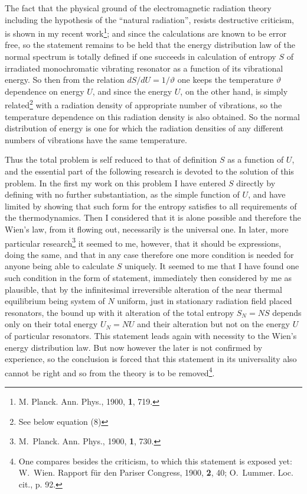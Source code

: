 \documentclass{article}
\begin{document}
The fact that the physical ground of the electromagnetic radiation theory 
including the hypothesis of the ``natural radiation'', 
resists destructive criticism, is shown
in my recent work\footnote{M. Planck. Ann. Phys., 1900, {\bf 1}, 719.};
and since the calculations are known to be error free, 
so the statement remains to be held 
that the energy distribution law of the normal spectrum is totally defined 
if one succeeds in calculation of entropy $S$ of irradiated 
monochromatic vibrating resonator as a function of its vibrational energy. 
So then from the relation $dS/dU = 1/\vartheta$ one keeps the temperature 
$\vartheta$ dependence on energy $U$, 
and since the energy $U$, on the other hand, is simply 
related\footnote{See below equation (8)} 
with a radiation density of appropriate number of vibrations, 
so the temperature dependence on this radiation density is also obtained.
So the normal distribution of energy is one for which the radiation densities 
of any different numbers of vibrations have the same temperature.

Thus the total problem is self reduced to that of 
definition $S$ as a function of $U$, 
and the essential part of the following research is devoted 
to the solution of this problem.
In the first my work on this problem I have entered $S$ directly 
by defining with no further substantiation, as the simple function of $U$, 
and have limited by showing that such form for the entropy 
satisfies to all requirements of the thermodynamics. 
Then I considered that it is alone possible and therefore the Wien's law, 
from it flowing out, necessarily is the universal one. 
In later, more particular 
research\footnote{M.~Planck. Ann. Phys., 1900, {\bf 1}, 730.} 
it seemed to me, however, that it should be expressions, doing the same, 
and that in any case therefore one more condition is needed 
for anyone being able to calculate $S$ uniquely.
It seemed to me that I have found one such condition in the form of statement, 
immediately then considered by me as plausible,
that by the infinitesimal irreversible alteration 
of the near thermal equilibrium being system of $N$ uniform, 
just in stationary radiation field placed resonators, 
the bound up with it alteration of the total entropy $S_N = N S$ 
depends only on their total energy $U_N = NU$ and their alteration 
but not on the energy $U$ of particular resonators.
This statement leads again with necessity 
to the Wien's energy distribution law.
But now however the later is not confirmed by experience, 
so the conclusion is forced 
that this statement in its universality also cannot be right 
and so from the theory is to be removed\footnote{One compares besides 
the criticism, to which this statement is exposed yet: 
W.~Wien. Rapport f\"ur den Pariser Congress, 1900, {\bf 2}, 40; 
O.~Lummer. Loc. cit., p. 92.}.
\end{document}
